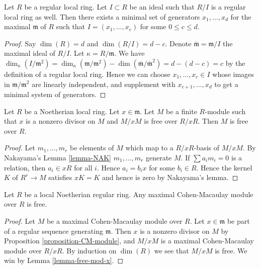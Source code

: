 \begin{lemma}
\label{lemma-regular-quotient-regular}
Let $R$ be a regular local ring. Let $I \subset R$ be an ideal
such that $R/I$ is a regular local ring as well. Then
there exists a minimal set of generators $x_1, \ldots, x_d$
for the maximal $\mathfrak m$ of $R$ such that
$I = (x_1, \ldots, x_c)$ for some $0 \leq c \leq d$.
\end{lemma}

\begin{proof}
Say $\dim(R) = d$ and $\dim(R/I) = d - c$.
Denote $\overline{\mathfrak m} = \mathfrak m/I$ the
maximal ideal of $R/I$. Let $\kappa = R/\mathfrak m$. We have
$\dim_\kappa(I/\mathfrak m^2) = \dim_\kappa(\mathfrak m/\mathfrak m^2)
- \dim(\overline{\mathfrak m}/\overline{\mathfrak m}^2) = d - (d -c) = c$
by the definition of a regular local ring. Hence we can choose
$x_1, \ldots, x_c \in I$ whose images in $\mathfrak m/\mathfrak m^2$
are linearly independent, and supplement with
$x_{c + 1}, \ldots, x_d$ to get a minimal system of generators.
\end{proof}

\begin{lemma}
\label{lemma-free-mod-x}
Let $R$ be a Noetherian local ring.
Let $x \in \mathfrak m$.
Let $M$ be a finite $R$-module such that
$x$ is a nonzero divisor on $M$ and
$M/xM$ is free over $R/xR$.
Then $M$ is free over $R$.
\end{lemma}

\begin{proof}
Let $m_1, \ldots, m_r$ be elements of $M$ which map to
a $R/xR$-basis of $M/xM$. By Nakayama's Lemma \ref{lemma-NAK}
$m_1, \ldots, m_r$ generate $M$. If $\sum a_i m_i = 0$
is a relation, then $a_i \in xR$ for all $i$. Hence
$a_i = b_i x$ for some $b_i \in R$. Hence
the kernel $K$ of $R^r \to M$ satisfies $xK = K$
and hence is zero by Nakayama's lemma.
\end{proof}

\begin{lemma}
\label{lemma-regular-mcm-free}
Let $R$ be a local Noetherian regular ring.
Any maximal Cohen-Macaulay module over $R$ is
free.
\end{lemma}

\begin{proof}
Let $M$ be a maximal Cohen-Macaulay module over $R$.
Let $x \in \mathfrak m$ be part of a regular sequence
generating $\mathfrak m$. Then $x$ is a nonzero divisor
on $M$ by Proposition \ref{proposition-CM-module}, and
$M/xM$ is a maximal Cohen-Macaulay module over $R/xR$.
By induction on $\dim(R)$ we see that $M/xM$ is free.
We win by Lemma \ref{lemma-free-mod-x}.
\end{proof}

